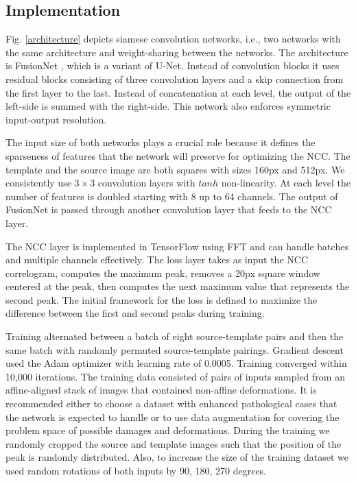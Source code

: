 \documentclass{article}
\begin{document}
\subsection{Implementation} 
  
 Fig. \ref{architecture} depicts siamese convolution networks, i.e., two networks with the same architecture and weight-sharing between the networks. The architecture is FusionNet \citet{hegde2016fusionnet}, which is a variant of U-Net. Instead of convolution blocks it uses residual blocks consisting of three convolution layers and a skip connection from the first layer to the last. Instead of concatenation at each level, the output of the left-side is summed with the right-side. This network also enforces symmetric input-output resolution.
 
 The input size of both networks plays a crucial role because it defines the sparseness of features that the network will preserve for optimizing the NCC. The template and the source image are both squares with sizes 160px and 512px. We consistently use $3\times 3$ convolution layers with $tanh$ non-linearity. At each level the number of features is doubled starting with 8 up to 64 channels. The output of FusionNet is passed through another convolution layer that feeds to the NCC layer. 

 The NCC layer is implemented in TensorFlow using FFT \citet{lewis1995fast} and can handle batches and multiple channels effectively. The loss layer takes as input the NCC correlogram, computes the maximum peak, removes a 20px square window centered at the peak, then computes the next maximum value that represents the second peak. The initial framework for the loss is defined to maximize the difference between the first and second peaks during training. 
 

 Training alternated between a batch of eight source-template pairs and then the same batch with randomly permuted source-template pairings. Gradient descent used the Adam optimizer with learning rate of 0.0005. Training converged within 10,000 iterations. The training data consisted of pairs of inputs sampled from an affine-aligned stack of images that contained non-affine deformations. It is recommended either to choose a dataset with enhanced pathological cases that the network is expected to handle or to use data augmentation for covering the problem space of possible damages and deformations. During the training we randomly cropped the source and template images such that the position of the peak is randomly distributed. Also, to increase the size of the training dataset we used random rotations of both inputs by 90, 180, 270 degrees. 
 
\end{document}
